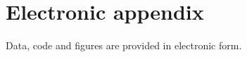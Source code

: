 \documentclass[12pt]{article}
\begin{document}


\setcounter{page}{4}

\appendix

% 

\section{Electronic appendix}
\label{el_app}

Data, code and figures are provided in electronic form.

\newpage
    

\RaggedRight



% 

\end{document}
